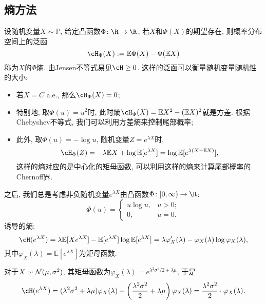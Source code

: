 \subsection{熵方法}
设随机变量$X \sim \mathbb{P}$, 给定凸函数$\Phi \colon \R \to \R$, 若$X$和$\Phi(X)$的期望存在, 则概率分布空间上的泛函
\begin{equation*}
	\cH_\Phi(X) := \mathbb{E}\Phi(X) - \Phi(\mathbb{E}X)  
\end{equation*}
称为$X$的$\Phi$熵.
由Jensen不等式易见$\cH \geq 0$.
这样的泛函可以衡量随机变量随机性的大小: 
\begin{itemize}
	\item 若$X = C$ a.e., 那么$\cH_\Phi (X) = 0$; 
	\item 特别地, 取$\Phi(u) = u^2$时, 此时熵$\cH_\Phi(X) = \mathbb{E}X^2 - (\mathbb{E}X)^2$就是方差. 根据Chebyshev不等式, 我们可以利用方差熵来控制尾部概率; 
	\item 此外, 取$\Phi(u) = - \log u$, 随机变量$Z = e^{\lambda X}$时, 
		\begin{equation*}
			\cH_\Phi(Z) 
			= - \lambda \mathbb{E}X + \log \mathbb{E}[e^{\lambda X}] 
			= \log \mathbb{E}[e^{\lambda(X - \mathbb{E}X)}], 
		\end{equation*}
		这样的熵对应的是中心化的矩母函数, 可以利用这样的熵来计算尾部概率的Chernoff界. 
\end{itemize}

之后, 我们总是考虑非负随机变量$e^{\lambda X}$由凸函数$\Phi \colon [0, \infty) \to \R$: 
\begin{equation*}
	\Phi(u) = 
	\begin{cases}
		u \log u, & u > 0; \\ 0, & u = 0. 
	\end{cases}
\end{equation*}
诱导的熵: 
\begin{equation}\label{eq:EntropyByMGF}
	\cH(e^{\lambda X}) 
	= \lambda \mathbb{E}[ X e^{\lambda X}] - \mathbb{E}[e^{\lambda X}] \log \mathbb{E}[e^{\lambda X}]
	= \lambda \varphi_X'(\lambda) - \varphi_X(\lambda) \log \varphi_X(\lambda), 
\end{equation}
其中$\varphi_X(\lambda) = \mathbb{E}[e^{\lambda X}]$为矩母函数. 

\begin{example}[Gauss随机变量的熵]
	对于$X \sim \mathcal{N}(\mu, \sigma^2)$, 其矩母函数为$\varphi_X(\lambda) = e^{\lambda^2 \sigma^2 / 2 + \lambda \mu}$, 于是
	\begin{equation}\label{eq:EntropyOfGaussianRV}
		\cH(e^{\lambda X}) 
		= (\lambda^2 \sigma^2 + \lambda \mu) \varphi_X(\lambda) - \left(\frac{\lambda^2 \sigma^2}{2} + \lambda\mu\right) \varphi_X(\lambda) 
		= \frac{\lambda^2 \sigma^2}{2} \cdot \varphi_X(\lambda). 
	\end{equation}
\end{example}

